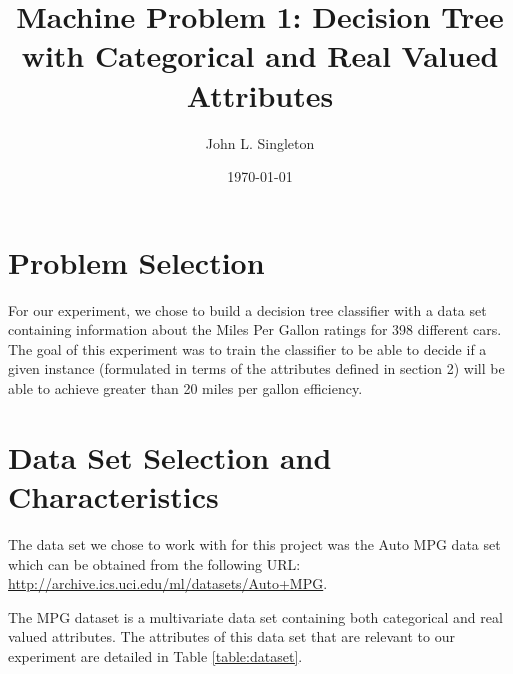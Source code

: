 \documentclass[letterpaper,12pt]{article}
\begin{document}
\title{Machine Problem 1: Decision Tree with Categorical and Real Valued Attributes}
\author{John L. Singleton}
\date{\today}
\maketitle

  

\section{Problem Selection}

For our experiment, we chose to build a decision tree classifier with a data set containing information about the Miles Per Gallon ratings for 398 different cars. The goal of this experiment was to train the classifier to be able to decide if a given instance (formulated in terms of the attributes defined in section 2) will be able to achieve greater than 20 miles per gallon efficiency.

\section{Data Set Selection and Characteristics} 

The data set we chose to work with for this project was the Auto MPG data set \cite{Lichman:2013} which can be obtained from the following URL: \href{http://archive.ics.uci.edu/ml/datasets/Auto+MPG}{http://archive.ics.uci.edu/ml/datasets/Auto+MPG}.

The MPG dataset is a multivariate data set containing both categorical and real valued attributes. The attributes of this data set that are relevant to our experiment are detailed in Table \ref{table:dataset}.
\end{document}
